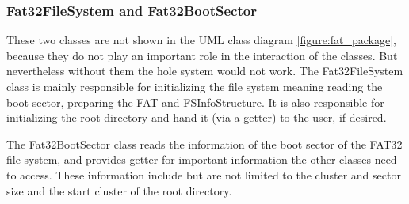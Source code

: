 \subsubsection{Fat32FileSystem and Fat32BootSector}

These two classes are not shown in the UML class diagram \ref{figure:fat_package}, because they do not play an important role in the interaction of the classes. But nevertheless without them the hole system would not work. The Fat32FileSystem class is mainly responsible for initializing the file system meaning reading the boot sector, preparing the FAT and FSInfoStructure. It is also responsible for initializing the root directory and hand it (via a getter) to the user, if desired.

The Fat32BootSector class reads the information of the boot sector of the FAT32 file system, and provides getter for important information the other classes need to access. These information include but are not limited to the cluster and sector size and the start cluster of the root directory.
